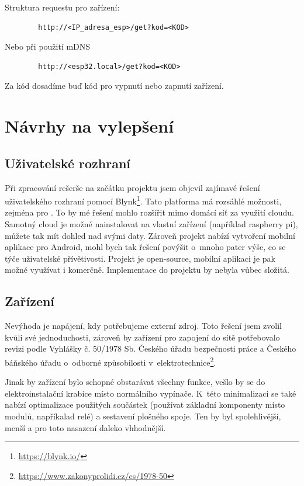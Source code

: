 \documentclass[11pt,a4paper,twoside,openright]{report}
\begin{document}
	
	Struktura requestu pro zařízení:
	\begin{verbatim}
		http://<IP_adresa_esp>/get?kod=<KOD>
	\end{verbatim}
	Nebo při použití mDNS
	\begin{verbatim}
		http://<esp32.local>/get?kod=<KOD>
	\end{verbatim}
	
	Za kód dosadíme buď kód pro vypnutí nebo zapnutí zařízení.
	
	\section{Návrhy na vylepšení}
	\subsection{Uživatelské rozhraní}
	Při zpracování rešerše na začátku projektu jsem objevil zajímavé řešení uživatelského rozhraní pomocí Blynk\footnote{\url{https://blynk.io/}}. Tato platforma má rozsáhlé možnosti, zejména pro . To by mé řešení mohlo rozšířit mimo  domácí síť za využití cloudu. Samotný cloud je možné nainstalovat na vlastní zařízení (například raspberry pi), můžete tak mít dohled nad svými daty. Zároveň projekt nabízí vytvoření mobilní aplikace pro Android, mohl bych tak řešení povýšit o~mnoho pater výše, co se týče uživatelské přívětivosti. Projekt je open-source, mobilní aplikaci je pak možné využívat i komerčně. Implementace do projektu by nebyla vůbec složitá.
	
	
	\subsection{Zařízení}
	Nevýhoda  je napájení, kdy potřebujeme externí zdroj. Toto řešení jsem zvolil kvůli své jednoduchosti, zároveň by zařízení pro zapojení do sítě potřebovalo revizi podle Vyhlášky č. 50/1978 Sb. Českého úřadu bezpečnosti práce a Českého báňského úřadu o~odborné způsobilosti v~elektrotechnice\footnote{\url{https://www.zakonyprolidi.cz/cs/1978-50}}. 
	
	
	Jinak by zařízení bylo schopné obstarávat všechny funkce, vešlo by se do elektroinstalační krabice místo normálního vypínače. K~této minimalizaci se také nabízí optimalizace použitých součástek (používat základní komponenty místo modulů, napříkalad relé) a sestavení plošného spoje. Ten by byl spolehlivější, menší a pro toto nasazení daleko vhhodnější.
	
\end{document}
